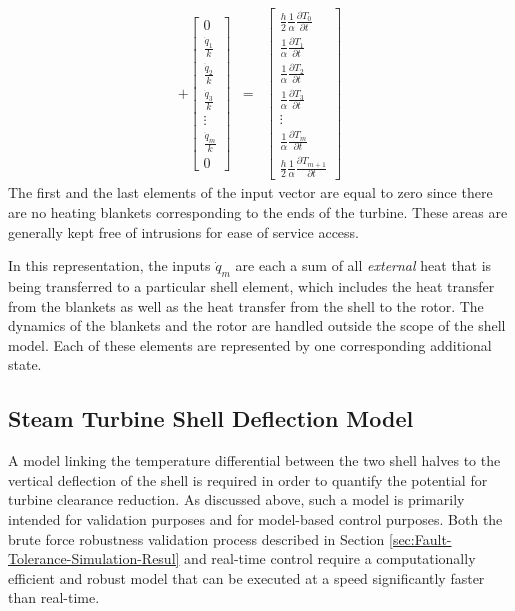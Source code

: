 \documentclass[a4paper, 10pt, conference]{ieeeconf}      %
\begin{document}
\begin{eqnarray*}
+\left[\begin{array}{c}
0\\
\frac{\dot{q}_{1}}{k}\\
\frac{\dot{q}_{2}}{k}\\
\frac{\dot{q}_{3}}{k}\\
\vdots\\
\frac{\dot{q}_{m}}{k}\\
0
\end{array}\right] & = & \left[\begin{array}{c}
\frac{h}{2}\frac{1}{\alpha}\frac{\partial T_{0}}{\partial t}\\
\frac{1}{\alpha}\frac{\partial T_{1}}{\partial t}\\
\frac{1}{\alpha}\frac{\partial T_{2}}{\partial t}\\
\frac{1}{\alpha}\frac{\partial T_{3}}{\partial t}\\
\vdots\\
\frac{1}{\alpha}\frac{\partial T_{m}}{\partial t}\\
\frac{h}{2}\frac{1}{\alpha}\frac{\partial T_{m+1}}{\partial t}
\end{array}\right]
\end{eqnarray*}
The first and the last elements of the
input vector are equal to zero since there are no heating blankets
corresponding to the ends of the turbine. These areas are generally
kept free of intrusions for ease of service access. 

In this representation, the inputs $\dot{q}_{m}$ are each a sum of all \emph{external} heat that is being transferred to a particular shell element, which
includes the heat transfer from the blankets as well as the heat transfer
from the shell to the rotor. The dynamics of the blankets and the
rotor are handled outside the scope of the shell model.  Each of these elements are represented by one corresponding additional state.

\subsection{Steam Turbine Shell Deflection Model\label{sub:Shell-Deflection-Model}}
A model linking the temperature differential between the two shell halves to the vertical deflection of the shell is required in order to quantify the potential for turbine clearance reduction. As discussed above, such a model is primarily intended for validation purposes and for model-based control purposes. Both the brute force robustness validation process described in Section \ref{sec:Fault-Tolerance-Simulation-Resul} and real-time control require a computationally efficient and robust model that can be executed at a speed significantly faster than real-time.
\end{document}
